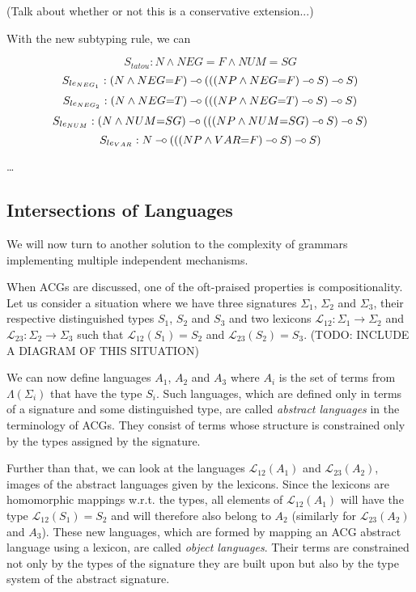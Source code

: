 (Talk about whether or not this is a conservative extension...)

With the new subtyping rule, we can

$$
S_{tatou} : N \land NEG{=}F \land NUM{=}SG
$$
$$
S_{le_{NEG_1}} : (N \land NEG{=}F) \mathbin{{-}\mkern-3.5mu{\circ}} (((NP \land NEG{=}F) \mathbin{{-}\mkern-3.5mu{\circ}} S) \mathbin{{-}\mkern-3.5mu{\circ}} S)
$$
$$
S_{le_{NEG_2}} : (N \land NEG{=}T) \mathbin{{-}\mkern-3.5mu{\circ}} (((NP \land NEG{=}T) \mathbin{{-}\mkern-3.5mu{\circ}} S) \mathbin{{-}\mkern-3.5mu{\circ}} S)
$$
$$
S_{le_{NUM}} : (N \land NUM{=}SG) \mathbin{{-}\mkern-3.5mu{\circ}} (((NP \land NUM{=}SG) \mathbin{{-}\mkern-3.5mu{\circ}} S) \mathbin{{-}\mkern-3.5mu{\circ}} S)
$$
$$
S_{le_{VAR}} : N \mathbin{{-}\mkern-3.5mu{\circ}} (((NP \land VAR{=}F) \mathbin{{-}\mkern-3.5mu{\circ}} S) \mathbin{{-}\mkern-3.5mu{\circ}} S)
$$

\ldots


\subsection{Intersections of Languages}

We will now turn to another solution to the complexity of grammars
implementing multiple independent mechanisms.

When ACGs are discussed, one of the oft-praised properties is
compositionality. Let us consider a situation where we have three
signatures $\Sigma_1$, $\Sigma_2$ and $\Sigma_3$, their respective
distinguished types $S_1$, $S_2$ and $S_3$ and two lexicons
$\mathcal{L}_{12} : \Sigma_1 \to \Sigma_2$ and $\mathcal{L}_{23} :
\Sigma_2 \to \Sigma_3$ such that $\mathcal{L}_{12}(S_1) = S_2$ and
$\mathcal{L}_{23}(S_2) = S_3$. (TODO: INCLUDE A DIAGRAM OF THIS
SITUATION)

We can now define languages $A_1$, $A_2$ and $A_3$ where $A_i$ is the
set of terms from $\Lambda(\Sigma_i)$ that have the type $S_i$. Such
languages, which are defined only in terms of a signature and some
distinguished type, are called \emph{abstract languages} in the
terminology of ACGs. They consist of terms whose structure is
constrained only by the types assigned by the signature.

Further than that, we can look at the languages $\mathcal{L}_{12}(A_1)$
and $\mathcal{L}_{23}(A_2)$, images of the abstract languages given by
the lexicons. Since the lexicons are homomorphic mappings w.r.t. the
types, all elements of $\mathcal{L}_{12}(A_1)$ will have the type
$\mathcal{L}_{12}(S_1) = S_2$ and will therefore also belong to $A_2$
(similarly for $\mathcal{L}_{23}(A_2)$ and $A_3$). These new languages,
which are formed by mapping an ACG abstract language using a lexicon,
are called \emph{object languages}. Their terms are constrained not only
by the types of the signature they are built upon but also by the type
system of the abstract signature.

